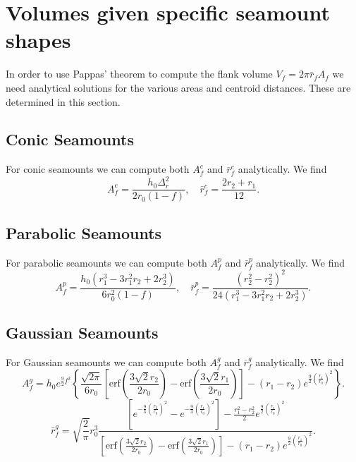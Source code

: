 \documentclass[12pt,letterpaper,margin=0.5in]{report}
\begin{document}
\section{Volumes given specific seamount shapes}

In order to use Pappas' theorem to compute the flank volume $V_f = 2 \pi \bar{r}_f A_f$ we need analytical
solutions for the various areas and centroid distances.  These are determined in this section.

\subsection{Conic Seamounts}

For conic seamounts we can compute both $A_f^c$ and $\bar{r}_f^c$ analytically.  We find
\begin{equation}
A_f^c = \frac{h_0 \Delta_r^2}{2 r_0 (1-f)}, \quad \bar{r}_f^c = \frac{2 r_2 + r_1}{12}.
\end{equation}

\subsection{Parabolic Seamounts}

For parabolic seamounts we can compute both $A_f^p$ and $\bar{r}_f^p$ analytically.  We find
\begin{equation}
A_f^p = \frac{h_0 \left ( r_1^3 - 3 r_1^2 r_2 + 2 r_2^3\right)}{6 r_0^2 (1-f)}, \quad \bar{r}_f^p = \frac{\left (r_2^2 - r_2^2 \right )^2}{24 \left ( r_1^3 - 3 r_1^2 r_2 + 2 r_2^3\right)}.
\end{equation}

\subsection{Gaussian Seamounts}

For Gaussian seamounts we can compute both $A_f^g$ and $\bar{r}_f^g$ analytically.  We find
\begin{equation}
A_f^g = h_0 e^{\frac{9}{2}f^2} \left \{ \frac{\sqrt{2\pi}}{6 r_0} \left [\mbox{erf} \left ( \frac{3\sqrt{2}r_2}{2 r_0}\right ) - \mbox{erf} \left ( \frac{3\sqrt{2}r_1}{2 r_0} \right ) \right ] - (r_1 - r_2)e^{\frac{9}{2}\left (\frac{r_1}{r_0}\right )^2} \right \}.
\end{equation}
\begin{equation}
\bar{r}_f^g = \sqrt{\frac{2}{\pi}} r_0^3\frac{\left [e^{-\frac{9}{3}\left (\frac{r_2}{r_0}\right)^2} - e^{-\frac{9}{3}\left (\frac{r_1}{r_0}\right)^2} \right ] - \frac{r_1^2 - r_2^2}{2}e^{\frac{9}{2}\left(\frac{r_1}{r_0}\right )^2}}{\left [\mbox{erf} \left ( \frac{3\sqrt{2}r_2}{2 r_0}\right ) - \mbox{erf} \left ( \frac{3\sqrt{2}r_1}{2 r_0} \right ) \right ] - (r_1 - r_2)e^{\frac{9}{2}\left (\frac{r_1}{r_0}\right )^2}}.
\end{equation}
\end{document}
